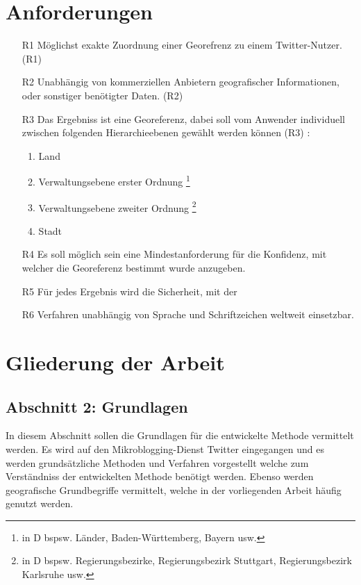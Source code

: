 	\section{Anforderungen}\label{sec:Anforderungen}
		\begin{enumerate}
			\item[R1] Möglichst exakte Zuordnung einer Georefrenz zu einem Twitter-Nutzer. (R1) 
			\item[R2] Unabhängig von kommerziellen Anbietern geografischer Informationen, oder sonstiger benötigter Daten. (R2)
			\item[R3] Das Ergebniss ist eine Georeferenz, dabei soll vom Anwender individuell zwischen folgenden Hierarchieebenen gewählt werden können (R3) : 
			\begin{enumerate}
			 	\item Land
			 	\item Verwaltungsebene erster Ordnung \footnote{in D bspsw. Länder, Baden-Württemberg, Bayern usw. }
			 	\item Verwaltungsebene zweiter Ordnung \footnote{in D bspsw. Regierungsbezirke, Regierungsbezirk Stuttgart, Regierungsbezirk Karlsruhe usw.}
			 	\item Stadt
			 \end{enumerate} 
			\item[R4] Es soll möglich sein eine Mindestanforderung für die Konfidenz, mit welcher die Georeferenz bestimmt wurde anzugeben.
			\item[R5] Für jedes Ergebnis wird die Sicherheit, mit der  
			\item[R6] Verfahren unabhängig von Sprache und Schriftzeichen weltweit einsetzbar.
		\end{enumerate}
		
	\section{Gliederung der Arbeit}

		\subsection*{Abschnitt 2: Grundlagen}
			In diesem Abschnitt sollen die Grundlagen für die entwickelte Methode vermittelt werden. 
			Es wird auf den Mikroblogging-Dienst Twitter eingegangen und es werden grundsätzliche Methoden und Verfahren vorgestellt welche zum Verständniss der entwickelten Methode benötigt werden. Ebenso werden geografische Grundbegriffe vermittelt, welche in der vorliegenden Arbeit häufig genutzt werden.

